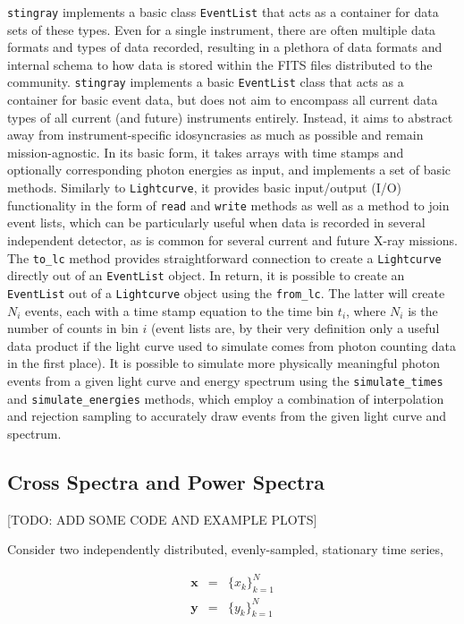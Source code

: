 \documentclass[12pt]{emulateapj}
\newcommand{\stingray}{\texttt{stingray}\xspace}
\newcommand{\lightcurve}{\texttt{Lightcurve}\xspace}
\newcommand{\eventlist}{\texttt{EventList}\xspace}
\begin{document}
\stingray implements a basic class \eventlist that acts as a container for data sets of these types. Even for a single instrument, there are often multiple data formats and types of data recorded, resulting in a plethora of data formats and internal schema to how data is stored within the FITS files distributed to the community. 
\stingray implements a basic \eventlist class that acts as a container for basic event data, but does not aim to encompass all current data types of all current (and future) instruments entirely. Instead, it aims to abstract away from instrument-specific idosyncrasies as much as possible and remain mission-agnostic. In its basic form, it takes arrays with time stamps and optionally corresponding photon energies as input, and implements a set of basic methods. Similarly to \lightcurve, it provides basic input/output (I/O) functionality in the form of \texttt{read} and \texttt{write} methods as well as a method to join event lists, which can be particularly useful when data is recorded in several independent detector, as is common for several current and future X-ray missions. The \verb|to_lc| method provides straightforward connection to create a \lightcurve directly out of an \eventlist object. In return, it is possible to create an \eventlist out of a \lightcurve object using the \verb|from_lc|. The latter will create $N_i$ events, each with a time stamp equation to the time bin $t_i$, where $N_i$ is the number of counts in bin $i$ (event lists are, by their very definition only a useful data product if the light curve used to simulate comes from photon counting data in the first place). 
It is possible to simulate more physically meaningful photon events from a given light curve and energy spectrum using the \verb|simulate_times| and \verb|simulate_energies| methods, which employ a combination of interpolation and rejection sampling to accurately draw events from the given light curve and spectrum.


\subsection{Cross Spectra and Power Spectra}
\label{sec:csps}

[TODO: ADD SOME CODE AND EXAMPLE PLOTS]

Consider two independently distributed, evenly-sampled, stationary time series,

\begin{eqnarray}
\mathbf{x} &=& \{x_k\}_{k=1}^N \nonumber \\
\mathbf{y} &=& \{y_k\}_{k=1}^N \nonumber
\end{eqnarray}
\end{document}
